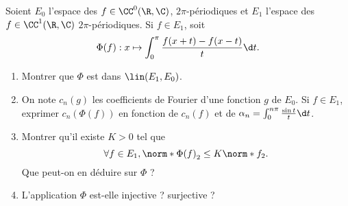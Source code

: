 \begin{enonce}
\begin{exercise}[ID={RMS 121-2 E1004},subtitle={},tags={}, difficulty={0}]
  Soient $E_0$ l'espace des $f\in\CC^0(\R,\C)$, $2\pi$-périodiques et $E_1$ l'espace des $f\in\CC^1(\R,\C)$ $2\pi$-périodiques.
  Si $f\in E_1$, soit
  \begin{equation*}
    \Phi(f):x\mapsto \int_0^\pi\frac{f(x+t)-f(x-t)}{t}\d t.
  \end{equation*}
  \begin{enumerate}
    \item Montrer que $\Phi$ est dans $\lin(E_1,E_0)$.
    \item On note $c_n(g)$ les coefficients de Fourier d'une fonction $g$ de $E_0$.
      Si $f\in E_1$, exprimer $c_n\left( \Phi(f) \right)$ en fonction de $c_n(f)$ et de $\alpha_n=\int_0^{n\pi}\frac{\sin t}{t} \d t$.
    \item Montrer qu'il existe $K>0$ tel que
      \begin{equation*}
        \forall f\in E_1, \norm*{\Phi(f)}_2 \leq K\norm*{f}_2.
      \end{equation*}
      Que peut-on en déduire sur $\Phi$ ?
    \item L'application $\Phi$ est-elle injective ? surjective ?
  \end{enumerate}
\end{exercise}
\begin{solution}
\end{solution}
\end{enonce}
